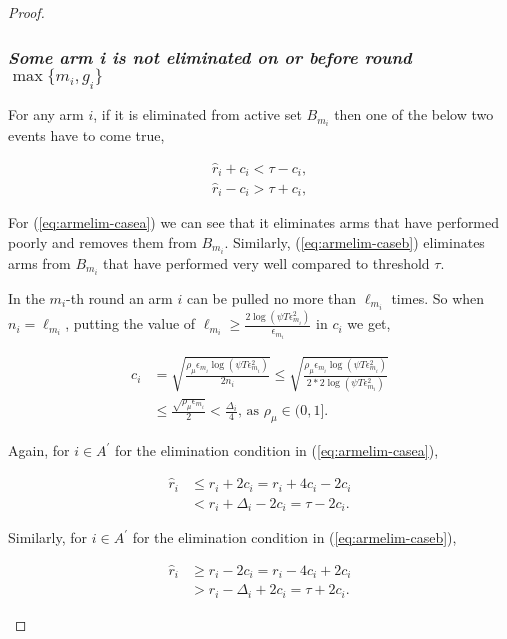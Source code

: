 \begin{proof}
\subsubsection{\textit{Some arm i is not eliminated on or before round $\max\lbrace m_{i},g_{i}\rbrace$}}
For any arm $i$, if it is eliminated from active set $B_{m_{i}}$ then one of the below two events have to come true,
\begin{small}
\begin{align}
\hat{r}_{i} + c_{i} < \tau - c_{i}, \label{eq:armelim-casea}\\
\hat{r}_{i} - c_{i} > \tau + c_{i}, \label{eq:armelim-caseb}
\end{align}
\end{small}
For (\ref{eq:armelim-casea}) we can see that it eliminates arms that have performed poorly and removes them  from $B_{m_{i}}$. Similarly, (\ref{eq:armelim-caseb}) eliminates arms from $B_{m_{i}}$ that have performed very well compared to threshold $\tau$.

In the $m_{i}$-th round an arm $i$ can be pulled no more than $\ell_{m_{i}}$ times. So when $n_{i}=\ell_{m_{i}}$, putting the value of $\ell_{m_{i}}\ge\frac{2\log{(\psi T\epsilon_{m_{i}}^{2})}}{\epsilon_{m_{i}}}$ in $c_{i}$ we get, 
\begin{small}
\begin{align*}
c_{i}&=\sqrt{\frac{\rho_{\mu}\epsilon_{m_{i}}\log (\psi T\epsilon_{m_{i}}^{2})}{2 n_{i}}}
\le\sqrt{\frac{\rho_{\mu}\epsilon_{m_{i}}\log (\psi T\epsilon_{m_{i}}^{2})}{2*2 \log(\psi T\epsilon_{m_{i}}^{2})}}\\
& \le\frac{\sqrt{\rho_{\mu}\epsilon_{m_{i}}}}{2}
 < \frac{\Delta_{i}}{4} \text{, as }\rho_{\mu}\in (0,1].
\end{align*}
\end{small}
Again, for ${i} \in A^{'}$ for the  elimination condition in (\ref{eq:armelim-casea}), 
\begin{small}
\begin{align*}
\hat{r}_{i} &\leq r_{i} + 2c_{i} = r_{i} + 4c_{i} - 2c_{i} \\
&< r_{i} + \Delta_{i} - 2c_{i} = \tau -2c_{i}.
\end{align*}
\end{small}
Similarly, for ${i} \in A^{'}$ for the  elimination condition in (\ref{eq:armelim-caseb}), 
\begin{small}
\begin{align*}
\hat{r}_{i} &\geq r_{i} - 2c_{i} = r_{i} - 4c_{i} + 2c_{i} \\
&> r_{i} - \Delta_{i} + 2c_{i}= \tau + 2c_{i}.
\end{align*}
\end{small}



\end{proof}
